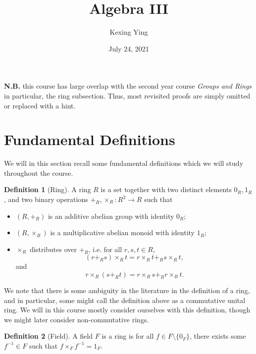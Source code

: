 \documentclass[]{article}
\title{Algebra III}
\author{Kexing Ying}
\date{July 24, 2021}
\theoremstyle{definition}
\theoremstyle{definition}
\newtheorem{definition}{Definition}[section]
\begin{document}
\maketitle

\begin{center}
  \begin{minipage}{.75\textwidth}
    \textbf{N.B.} this course has large overlap with the second year course 
    \textit{Groups and Rings} in particular, the ring subsection. Thus, 
    most revisited proofs are simply omitted or replaced with a hint.
  \end{minipage}
\end{center}

{
\hypersetup{linkcolor=}
\setcounter{tocdepth}{2}
\tableofcontents
}
\newpage

\section{Fundamental Definitions}

We will in this section recall some fundamental definitions which 
we will study throughout the course.

\begin{definition}[Ring]
  A ring \(R\) is a set together with two distinct elements \(0_R, 1_R\), and 
  two binary operations \(+_R, \times_R : R^2 \to R\) such that 
  \begin{itemize}
    \item \((R, +_R)\) is an additive abelian group with identity \(0_R\);
    \item \((R, \times_R)\) is a multiplicative abelian monoid with identity \(1_R\);
    \item \(\times_R\) distributes over \(+_R\), i.e. for all \(r, s, t \in R\), 
      \[(r +_R s) \times_R t = r \times_R t +_R s \times_R t,\] and 
      \[r \times_R (s +_R t) = r \times_R s +_R r \times_R t.\]
  \end{itemize}
\end{definition}

We note that there is some ambiguity in the literature in the definition of a 
ring, and in particular, some might call the definition above as a commutative 
unital ring. We will in this course mostly consider ourselves with this definition, 
though we might later consider non-commutative rings.

\begin{definition}[Field]
  A field \(F\) is a ring is for all \(f \in F \setminus \{0_F\}\), there 
  exists some \(f^{-1} \in F\) such that \(f \times_F f^{-1} = 1_F\).
\end{definition}
\end{document}
